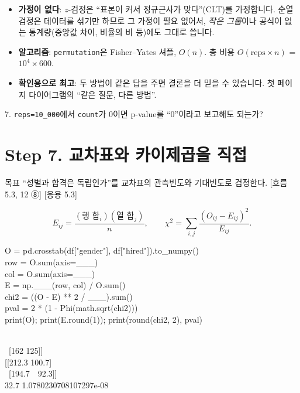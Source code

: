 \documentclass[11pt,a4paper]{article}
\newcommand{\code}[1]{\texttt{#1}}
\newcommand{\Wc}[1]{{\scriptsize\textsf{\color{blue!60!black}[흐름 #1]}}}
\newcommand{\Hc}[1]{{\scriptsize\textsf{\color{orange!70!black}[응용 #1]}}}
\begin{document}
\begin{algobox}
\begin{itemize}
\item \textbf{가정이 없다}: $z$-검정은 ``표본이 커서 정규근사가 맞다''(CLT)를 가정합니다. 순열 검정은 데이터를 섞기만 하므로 그 가정이 필요 없어서, \emph{작은 그룹}이나 공식이 없는 통계량(중앙값 차이, 비율의 비 등)에도 그대로 씁니다.
\item \textbf{알고리즘}: \code{permutation}은 Fisher–Yates 셔플, $O(n)$. 총 비용 $O(\text{reps}\times n)$ = $10^4\times600$.
\item \textbf{확인용으로 최고}: 두 방법이 같은 답을 주면 결론을 더 믿을 수 있습니다. 첫 페이지 다이어그램의 ``같은 질문, 다른 방법''.
\end{itemize}
\end{algobox}

\begin{qbox}
7. \code{reps=10\_000}에서 \code{count}가 0이면 p-value를 ``0''이라고 보고해도 되는가?
\end{qbox}

\section{Step 7. 교차표와 카이제곱을 직접}
\begin{goalbox}{목표}
``성별과 합격은 독립인가''를 교차표의 관측빈도와 기대빈도로 검정한다. \Wc{5.3, 12 ⑧} \Hc{5.3}
\end{goalbox}
\[
E_{ij}=\frac{(\text{행 합}_i)(\text{열 합}_j)}{n},\qquad \chi^2=\sum_{i,j}\frac{(O_{ij}-E_{ij})^2}{E_{ij}}.
\]

\begin{codebox}
O = pd.crosstab(df["gender"], df["hired"]).to\_numpy()\\
row = O.sum(axis=\_\_\_)\\
col = O.sum(axis=\_\_\_)\\
E = np.\_\_\_(row, col) / O.sum()\\
chi2 = ((O - E) ** 2 / \_\_\_).sum()\\
pval = 2 * (1 - Phi(math.sqrt(chi2)))\\
print(O); print(E.round(1)); print(round(chi2, 2), pval)
\end{codebox}
\begin{outbox}
[[245\ \ 68]\\
\ [162 125]]\\
{}[[212.3 100.7]\\
\ [194.7\ \ 92.3]]\\
32.7 1.0780230708107297e-08
\end{outbox}
\end{document}
